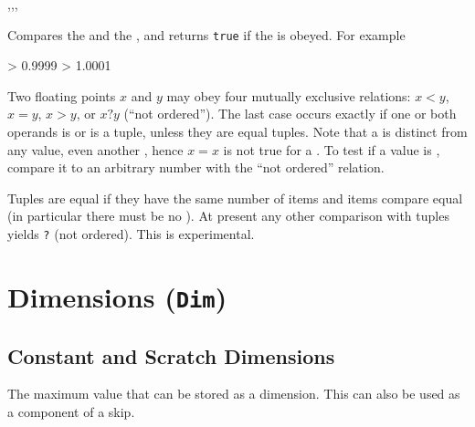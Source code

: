 \documentclass[oneside]{book}
\begin{document}
\begin{function}{\fpCompare,\fpCompareT,\fpCompareF,\fpCompareTF}
\begin{syntax}
   
    
    
     
\end{syntax}
Compares the  and the , and returns
\texttt{true} if the  is obeyed. For example
\begin{demohigh}
 > {0.9999} {} {}
 > {1.0001} {} {}
\end{demohigh}
Two floating points
$x$ and $y$ may obey four mutually exclusive relations:
$x<y$, $x=y$, $x>y$, or $x?y$ (\enquote{not ordered}).  The last
case occurs exactly if one or both operands is \nan{} or is a tuple,
unless they are equal tuples.  Note that a \nan{} is distinct from
any value, even another \nan{}, hence $x=x$ is not true for
a \nan{}.  To test if a value is \nan{}, compare it to an arbitrary
number with the \enquote{not ordered} relation.\par
Tuples are equal if they have the same number of items and items
compare equal (in particular there must be no \nan{}).
At present any other comparison with tuples yields \verb|?| (not ordered).
This is experimental.
\end{function}

\chapter{Dimensions (\texttt{Dim})}

\section{Constant and Scratch Dimensions}

\begin{variable}{\cMaxDim}
The maximum value that can be stored as a dimension.  This can also
be used as a component of a skip.
\end{variable}
\end{document}
